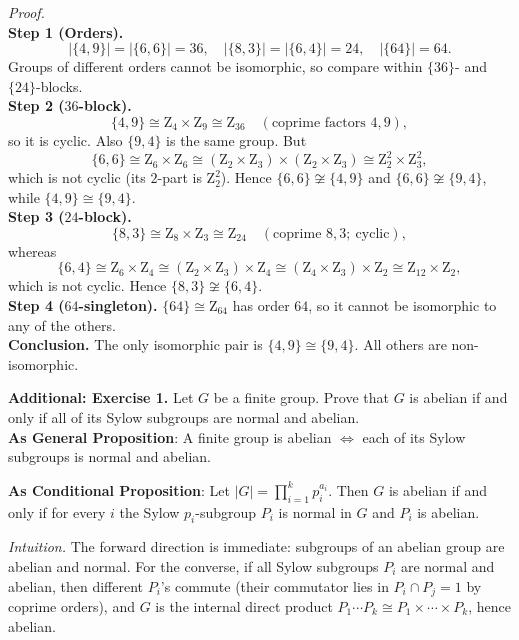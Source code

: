 \documentclass[11pt]{article}
\theoremstyle{definition}
\newcommand{\Z}{\mathrm{Z}}
\begin{document}
\dotfill

\emph{Proof.}\\
\textbf{Step 1 (Orders).} 
\[
|\{4,9\}|=|\{6,6\}|=36,\quad |\{8,3\}|=|\{6,4\}|=24,\quad |\{64\}|=64.
\]
Groups of different orders cannot be isomorphic, so compare within $\{36\}$- and $\{24\}$-blocks.\\

\textbf{Step 2 ($36$-block).} 
\[
\{4,9\}\cong \Z_4\times\Z_9\cong \Z_{36}\quad(\text{coprime factors }4,9),
\]
so it is cyclic. Also $\{9,4\}$ is the same group. But
\[
\{6,6\}\cong \Z_6\times\Z_6\cong (\Z_2\times\Z_3)\times(\Z_2\times\Z_3)\cong \Z_2^2\times \Z_3^2,
\]
which is not cyclic (its $2$-part is $\Z_2^2$). Hence $\{6,6\}\not\cong \{4,9\}$ and $\{6,6\}\not\cong \{9,4\}$, while $\{4,9\}\cong\{9,4\}$.\\

\textbf{Step 3 ($24$-block).}
\[
\{8,3\}\cong \Z_8\times\Z_3\cong \Z_{24}\quad(\text{coprime }8,3;\ \text{cyclic}),
\]
whereas
\[
\{6,4\}\cong \Z_6\times\Z_4\cong (\Z_2\times\Z_3)\times\Z_4\cong (\Z_4\times\Z_3)\times \Z_2\cong \Z_{12}\times \Z_2,
\]
which is not cyclic. Hence $\{8,3\}\not\cong \{6,4\}$.\\

\textbf{Step 4 ($64$-singleton).} $\{64\}\cong \Z_{64}$ has order $64$, so it cannot be isomorphic to any of the others.\\

\textbf{Conclusion.} The only isomorphic pair is $\boxed{\{4,9\}\cong\{9,4\}}$. All others are non-isomorphic.\\

\newpage

\noindent \textbf{Additional: Exercise 1.} Let $G$ be a finite group. Prove that $G$ is abelian if and only if all of its Sylow subgroups are normal and abelian. \\ %

\noindent\textbf{As General Proposition}: A finite group is abelian $\iff$ each of its Sylow subgroups is normal and abelian.

\noindent \textbf{As Conditional Proposition}: Let $|G|=\prod_{i=1}^k p_i^{a_i}$. Then $G$ is abelian if and only if for every $i$ the Sylow $p_i$-subgroup $P_i$ is normal in $G$ and $P_i$ is abelian.

\newpage

\dotfill

\emph{Intuition.} The forward direction is immediate: subgroups of an abelian group are abelian and normal. For the converse, if all Sylow subgroups $P_i$ are normal and abelian, then different $P_i$’s commute (their commutator lies in $P_i\cap P_j=1$ by coprime orders), and $G$ is the internal direct product $P_1\cdots P_k\cong P_1\times\cdots\times P_k$, hence abelian.
\end{document}
